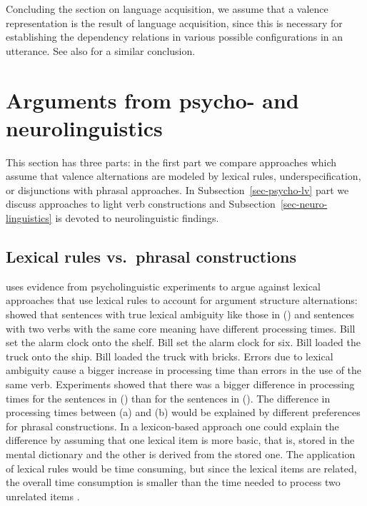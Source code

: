 \begin{exe}
\begin{xlist}[iv.]
\begin{exe}
\begin{xlist}[iv.]
Concluding the section on language acquisition, we assume that a valence representation is the
result of language acquisition, since this is necessary for establishing the dependency relations in
various possible configurations in an utterance. See also  for a similar conclusion. 

\section{Arguments from psycho- and neurolinguistics}
\label{sec-phrasal-psycho}

This section has three parts: in the first part we compare approaches which assume that valence
alternations are modeled by lexical rules, underspecification, or disjunctions with phrasal
approaches. In Subsection~\ref{sec-psycho-lv} part we discuss approaches to light verb constructions and Subsection~\ref{sec-neuro-linguistics}
is devoted to neurolinguistic findings.


\subsection{Lexical rules vs.\ phrasal constructions}
\label{sec-lr-phrasal-psycho}

\mbox{}\citet[Section~1.4.5]{Goldberg95a} uses evidence from psycholinguistic experiments to argue against lexical
approaches that use lexical rules to account for argument structure alternations: \citet{CT88a}
showed that sentences with true lexical ambiguity like those in () and sentences with two
verbs with the same core meaning have different processing times.
\eal
\ex Bill set the alarm clock onto the shelf.
\ex Bill set the alarm clock for six.
\zl
\eal
\ex Bill loaded the truck onto the ship.
\ex Bill loaded the truck with bricks.
\zl
Errors due to lexical ambiguity cause a bigger increase in processing time than errors in the use of
the same verb. Experiments showed that there was a bigger difference in processing times for the
sentences in () than for the sentences in (). The difference in processing times
between (a) and (b) would be explained by different preferences for phrasal
constructions. In a lexicon-based approach one could explain the difference by assuming that one
lexical item is more basic, that is, stored in the mental dictionary and the other is derived from
the stored one. The application of lexical rules would be time consuming, but since the lexical
items are related, the overall time consumption is smaller than the time needed to process
two unrelated items \citep[]{Mueller2002b}.


\end{xlist}
\end{exe}
\end{xlist}
\end{exe}

